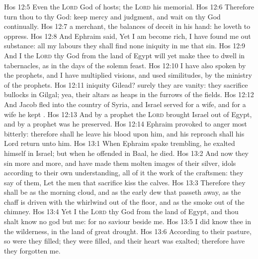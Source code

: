 \vs Hos 12:5 Even the \textsc{Lord} God of hosts; the \textsc{Lord}  his memorial.
\vs Hos 12:6 Therefore turn thou to thy God: keep mercy and judgment, and wait on thy God continually.
\vs Hos 12:7  a merchant, the balances of deceit  in his hand: he loveth to oppress.
\vs Hos 12:8 And Ephraim said, Yet I am become rich, I have found me out substance:  all my labours they shall find none iniquity in me that  sin.
\vs Hos 12:9 And I  the \textsc{Lord} thy God from the land of Egypt will yet make thee to dwell in tabernacles, as in the days of the solemn feast.
\vs Hos 12:10 I have also spoken by the prophets, and I have multiplied visions, and used similitudes, by the ministry of the prophets.
\vs Hos 12:11  iniquity  Gilead? surely they are vanity: they sacrifice bullocks in Gilgal; yea, their altars  as heaps in the furrows of the fields.
\vs Hos 12:12 And Jacob fled into the country of Syria, and Israel served for a wife, and for a wife he kept .
\vs Hos 12:13 And by a prophet the \textsc{Lord} brought Israel out of Egypt, and by a prophet was he preserved.
\vs Hos 12:14 Ephraim provoked  to anger most bitterly: therefore shall he leave his blood upon him, and his reproach shall his Lord return unto him.
\vs Hos 13:1 When Ephraim spake trembling, he exalted himself in Israel; but when he offended in Baal, he died.
\vs Hos 13:2 And now they sin more and more, and have made them molten images of their silver,  idols according to their own understanding, all of it the work of the craftsmen: they say of them, Let the men that sacrifice kiss the calves.
\vs Hos 13:3 Therefore they shall be as the morning cloud, and as the early dew that passeth away, as the chaff  is driven with the whirlwind out of the floor, and as the smoke out of the chimney.
\vs Hos 13:4 Yet I  the \textsc{Lord} thy God from the land of Egypt, and thou shalt know no god but me: for  no saviour beside me.
\vs Hos 13:5 I did know thee in the wilderness, in the land of great drought.
\vs Hos 13:6 According to their pasture, so were they filled; they were filled, and their heart was exalted; therefore have they forgotten me.
